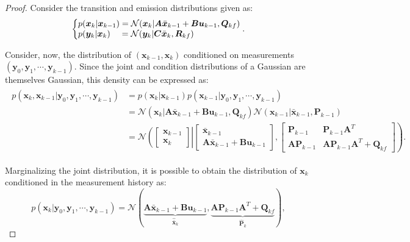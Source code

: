 \documentclass[a4paper,11pt]{book}
\numberwithin{figure}{chapter}
\numberwithin{equation}{chapter}
\numberwithin{table}{chapter}
\theoremstyle{definition}
\begin{document}
\begin{proof}
    Consider the transition and emission distributions given as:
    \begin{align}
    \left\{ \begin{matrix*}[l]
        p(\bm{x}_{k} | \bm{x}_{k-1}) = \mathcal{N}(\bm{x}_k | \bm{A}\bar{\bm{x}}_{k-1} + \bm{B}\bm{u}_{k-1}, \bm{Q}_{kf}) \\
         p(\bm{y}_{k} | \bm{x}_{k})\phantom{_{-1}} = \mathcal{N}(\bm{y}_k | \bm{C}\bar{\bm{x}}_{k}, \bm{R}_{kf}) \hfill
    \end{matrix*} \right.
    .\end{align}
    
    \noindent Consider, now, the distribution of $\left( \bm{x}_{k-1}, \bm{x}_k \right)$ conditioned on measurements $\left( \bm{y}_0, \bm{y}_1, \cdots, \bm{y}_{k-1} \right)$. Since the joint and condition distributions of a Gaussian are themselves Gaussian, this density can be expressed as:
    \begin{align}
    \begin{split}
        p(\bm{x}_k, \bm{x}_{k-1} | \bm{y}_0, \bm{y}_1, \cdots, \bm{y}_{k-1}) &= p(\bm{x}_k | \bm{x}_{k-1}) p(\bm{x}_{k-1} | \bm{y}_0, \bm{y}_1, \cdots, \bm{y}_{k-1}) \\
        &= \mathcal{N}(\bm{x}_k | \bm{A}\bar{\bm{x}}_{k-1}+\bm{B}\bm{u}_{k-1}, \bm{Q}_{kf}) \mathcal{N}(\bm{x}_{k-1} | \bar{\bm{x}}_{k-1}, \bm{P}_{k-1}) \\
        &= \mathcal{N}\left( \begin{bmatrix} \bm{x}_{k-1} \\ \bm{x}_{k} \end{bmatrix}    \right| \left. \begin{bmatrix} \bar{\bm{x}}_{k-1} \\ \bm{A}\bar{\bm{x}}_{k-1}+\bm{B}\bm{u}_{k-1} \end{bmatrix}, \begin{bmatrix} \bm{P}_{k-1} & \bm{P}_{k-1} \bm{A}^T  \\ \bm{A} \bm{P}_{k-1} & \bm{A} \bm{P}_{k-1} \bm{A}^T + \bm{Q}_{kf} \end{bmatrix}  \right).
    \end{split}
    \end{align}
    
    Marginalizing the joint distribution, it is possible to obtain the distribution of $\bm{x}_k$ conditioned in the measurement history as:
    \begin{equation}
        p(\bm{x}_k | \bm{y}_0, \bm{y}_1, \cdots, \bm{y}_{k-1}) = \mathcal{N}( \underbrace{\bm{A} \bar{\bm{x}}_{k-1} + \bm{B} \bm{u}_{k-1}}_{\hat{\bar{\bm{x}}}_k}, \underbrace{\bm{A} \bm{P}_{k-1} \bm{A}^T + \bm{Q}_{kf}}_{\hat{\bm{P}}_k} )
    ,\end{equation}
    

\end{proof}
\end{document}
